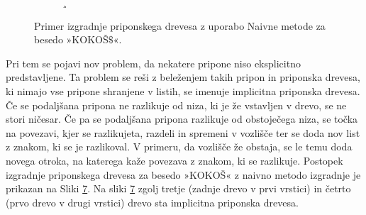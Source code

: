 \begin{figure}[htb]
    \begin{subfigure}[t]{0.3\linewidth}
        \subcaption*{}
            
            \centering
            \label{fig:Naivna1}
        \end{subfigure}
        \hspace{0.5cm}
        \begin{subfigure}[t]{0.3\linewidth}¸
            \subcaption*{}
            
            \centering
            \label{fig:Naivna2}
        \end{subfigure}
        \hspace{0.5cm}
        \begin{subfigure}[t]{0.3\linewidth}
            \subcaption*{}
            
            \centering
            \label{fig:Naivna3}
        \end{subfigure}
        
        \begin{subfigure}[t]{0.3\linewidth}
            \subcaption*{}
            
            \centering
            \label{fig:Naivna4}
        \end{subfigure}
        \hspace{0.5cm}
        \begin{subfigure}[t]{0.3\linewidth}
            \subcaption*{}
            
            \centering
            \label{fig:Naivna5}
        \end{subfigure}
        \hspace{0.5cm}
        \begin{subfigure}[t]{0.3\textwidth}
            \subcaption*{}
            
            \centering
            \label{fig:Naivna6}
        \end{subfigure}
    
           \caption{Primer izgradnje priponskega drevesa z uporabo Naivne metode za besedo »KOKOŠ$\$$«.} 
            \label{fig:Naivna}
    \end{figure}

Pri tem se pojavi nov problem, da nekatere pripone niso eksplicitno predstavljene. Ta problem se reši z beleženjem takih pripon in priponska drevesa, ki nimajo vse pripone shranjene v listih, se imenuje implicitna priponska drevesa.  Če se podaljšana pripona ne razlikuje od niza, ki je že vstavljen v drevo, se ne stori ničesar. Če pa se podaljšana pripona razlikuje od obstoječega niza, se točka na povezavi, kjer se razlikujeta, razdeli in spremeni v vozlišče ter se doda nov list z znakom, ki se je razlikoval. V primeru, da vozlišče že obstaja, se le temu doda novega otroka, na katerega kaže povezava z znakom, ki se razlikuje. Postopek izgradnje priponskega drevesa za besedo »KOKOŠ« z naivno metodo izgradnje je prikazan na Sliki \ref{fig:Naivna}. Na sliki \ref{fig:Naivna} zgolj tretje (zadnje drevo v prvi vrstici) in četrto (prvo drevo v drugi vrstici) drevo sta implicitna priponska drevesa.

